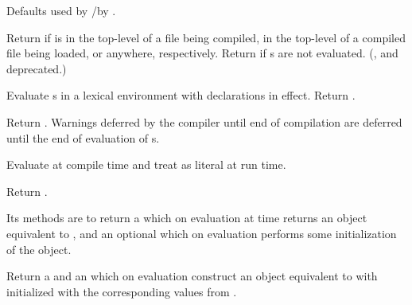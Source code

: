 \begin{LIST}{1cm}
  {
    Defaults used by /by .
  }

  {
    Return  if
     is in the top-level of a file being compiled, in the
    top-level of a compiled file being loaded, or anywhere,
    respectively. Return \retval{\NIL} if s are not
    evaluated. (,  and  deprecated.)
  }

  {
    Evaluate s in a lexical environment with declarations
     in effect. Return .
  }

  {
    Return . Warnings deferred by the
    compiler until end of compilation are deferred until the end of
    evaluation of s.
  }

  {
    Evaluate  at compile time and treat  as
    literal at run time.
  }

  {
    Return .
  }

  {
    Its methods are to return a  which on
    evaluation at  time returns an object equivalent to
    , and an optional  which on
    evaluation performs some initialization of the object.
  }

  {
    Return a  and an  which on evaluation construct an object equivalent to
     with  initialized with the corresponding values
    from .
  }


\end{LIST}
